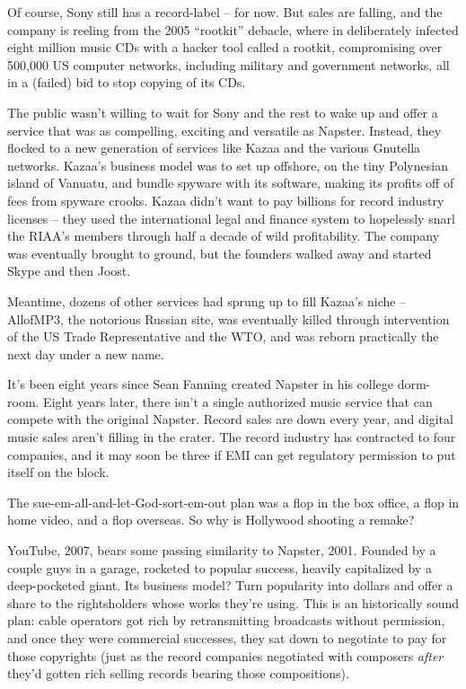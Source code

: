Of course, Sony still has a record-label -- for now. But sales are
falling, and the company is reeling from the 2005 ``rootkit''
debacle, where in deliberately infected eight million music CDs
with a hacker tool called a rootkit, compromising over 500,000 US
computer networks, including military and government networks, all
in a (failed) bid to stop copying of its CDs.

The public wasn't willing to wait for Sony and the rest to wake up
and offer a service that was as compelling, exciting and versatile
as Napster. Instead, they flocked to a new generation of services
like Kazaa and the various Gnutella networks. Kazaa's business
model was to set up offshore, on the tiny Polynesian island of
Vanuatu, and bundle spyware with its software, making its profits
off of fees from spyware crooks. Kazaa didn't want to pay billions
for record industry licenses -- they used the international legal
and finance system to hopelessly snarl the RIAA's members through
half a decade of wild profitability. The company was eventually
brought to ground, but the founders walked away and started Skype
and then Joost.

Meantime, dozens of other services had sprung up to fill Kazaa's
niche -- AllofMP3, the notorious Russian site, was eventually
killed through intervention of the US Trade Representative and the
WTO, and was reborn practically the next day under a new name.

It's been eight years since Sean Fanning created Napster in his
college dorm-room. Eight years later, there isn't a single
authorized music service that can compete with the original
Napster. Record sales are down every year, and digital music sales
aren't filling in the crater. The record industry has contracted to
four companies, and it may soon be three if EMI can get regulatory
permission to put itself on the block.

The sue-em-all-and-let-God-sort-em-out plan was a flop in the box
office, a flop in home video, and a flop overseas. So why is
Hollywood shooting a remake?

\bigskip

YouTube, 2007, bears some passing similarity to Napster, 2001.
Founded by a couple guys in a garage, rocketed to popular success,
heavily capitalized by a deep-pocketed giant. Its business model?
Turn popularity into dollars and offer a share to the rightsholders
whose works they're using. This is an historically sound plan:
cable operators got rich by retransmitting broadcasts without
permission, and once they were commercial successes, they sat down
to negotiate to pay for those copyrights (just as the record
companies negotiated with composers \emph{after} they'd gotten
rich selling records bearing those compositions).

